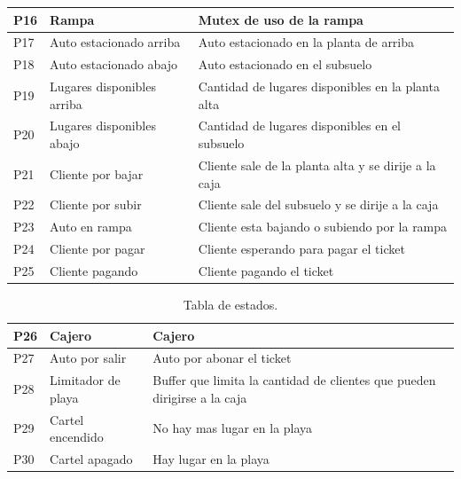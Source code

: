 \documentclass[12pt,a4paper]{article}
\begin{document}
\begin{table}[H]
\begin{tabular}[width=15cm]{ || C{1.5cm} | L{5cm} | L{8.5cm} || }
	P16 & Rampa & Mutex de uso de la rampa  \\ \hline
	P17 & Auto estacionado arriba & Auto estacionado en la planta de arriba  \\ \hline
	P18 & Auto estacionado abajo & Auto estacionado en el subsuelo  \\ \hline
	P19 & Lugares disponibles arriba & Cantidad de lugares disponibles en la planta alta \\ \hline
	P20 & Lugares disponibles abajo & Cantidad de lugares disponibles en el subsuelo  \\ \hline
	P21 & Cliente por bajar & Cliente sale de la planta alta y se dirije a la caja   \\ \hline
	P22 & Cliente por subir & Cliente sale del subsuelo y se dirije a la caja  \\ \hline
	P23 & Auto en rampa & Cliente esta bajando o subiendo por la rampa  \\ \hline
	P24 & Cliente por pagar & Cliente esperando para pagar el ticket  \\ \hline
	P25 & Cliente pagando & Cliente pagando el ticket \\ \hline
\end{tabular}
\end{table}
\begin{table}[H]
\centering
\begin{tabular}[width=15cm]{ || C{1.5cm} | L{5cm} | L{8.5cm} || }
\hline
	P26 & Cajero & Cajero \\ \hline
	P27 & Auto por salir & Auto por abonar el ticket \\ \hline
	P28 & Limitador de playa & Buffer que limita la cantidad de clientes que pueden dirigirse a la caja \\ \hline
	P29 & Cartel encendido & No hay mas lugar en la playa \\ \hline
	P30 & Cartel apagado & Hay lugar en la playa \\ \hline
\end{tabular}
\caption{Tabla de estados.}
\label{table:plazas}
\end{table}
\end{document}
